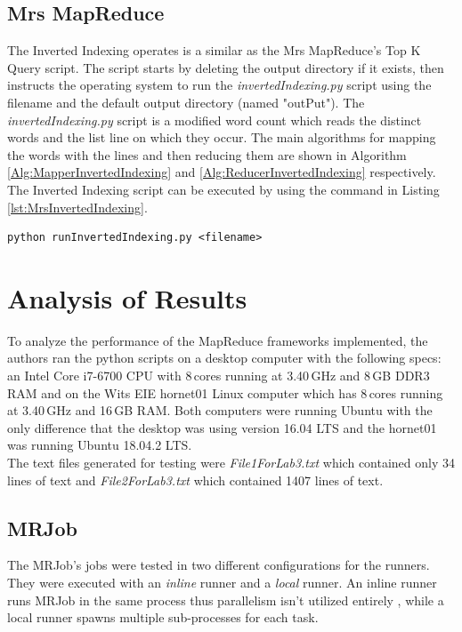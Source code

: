 \documentclass[10pt, twocolumn]{article}
\begin{document}
\subsection{Mrs MapReduce}
%
The Inverted Indexing operates is a similar as the Mrs MapReduce's Top K Query script. The script starts by deleting the output directory if it exists, then instructs the operating system to run the \emph{invertedIndexing.py} script using the filename and the default output directory (named "outPut"). The \emph{invertedIndexing.py} script is a modified word count which reads the distinct words and the list line on which they occur. The main algorithms for mapping the words with the lines and then reducing them  are shown in Algorithm \ref*{Alg:MapperInvertedIndexing} and \ref*{Alg:ReducerInvertedIndexing} respectively. The Inverted Indexing script can be executed by using the command in Listing \ref*{lst:MrsInvertedIndexing}.
%
\begin{center}
\begin{minipage}{0.99\columnwidth}
\begin{lstlisting}[style=bashStyle, label=lst:MrsInvertedIndexing, caption = Command to execute Inverted Indexing (Mrs)]
python runInvertedIndexing.py <filename>
\end{lstlisting}
\end{minipage}
\end{center}
%

%
\section{Analysis of Results}
To analyze the performance of the MapReduce frameworks implemented, the authors ran the python scripts on a desktop computer with the following specs: an Intel Core i7-6700 CPU with 8\,cores running at 3.40\,GHz and 8\,GB DDR3\,RAM and on the Wits EIE hornet01 Linux computer which has 8\,cores running at 3.40\,GHz and 16\,GB RAM. Both computers were running Ubuntu with the only difference that the desktop was using version 16.04 LTS and the hornet01 was running Ubuntu 18.04.2 LTS.\\

\noindent The text files generated for testing were \emph{File1ForLab3.txt} which contained only 34 lines of text and \emph{File2ForLab3.txt} which contained 1407 lines of text. 
%
\subsection{MRJob}
%
The MRJob's jobs were tested in two different configurations for the runners. They were executed with an \emph{inline} runner and a \emph{local} runner. An inline runner runs MRJob in the same process thus parallelism isn't utilized entirely \cite{ELEN4020A_REF:MRJobLocalRunner}, while a local runner spawns multiple sub-processes for each task\cite{ELEN4020A_REF:MRJobInlineRunner}. \\
\end{document}

